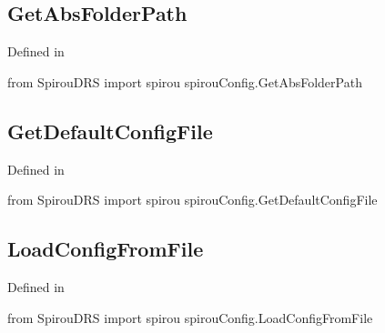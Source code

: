 \begin{minipage}{\textwidth}
\subsection{GetAbsFolderPath}

Defined in \spirou {}

\begin{pythonbox}
from SpirouDRS import spirou
spirouConfig.GetAbsFolderPath

\end{pythonbox}

\begin{pythondocstring}

\end{pythondocstring}
\end{minipage}

\begin{minipage}{\textwidth}
\subsection{GetDefaultConfigFile}

Defined in \spirou {}

\begin{pythonbox}
from SpirouDRS import spirou
spirouConfig.GetDefaultConfigFile

\end{pythonbox}

\begin{pythondocstring}

\end{pythondocstring}
\end{minipage}

\begin{minipage}{\textwidth}
\subsection{LoadConfigFromFile}

Defined in \spirou {}

\begin{pythonbox}
from SpirouDRS import spirou
spirouConfig.LoadConfigFromFile

\end{pythonbox}

\begin{pythondocstring}

\end{pythondocstring}
\end{minipage}

